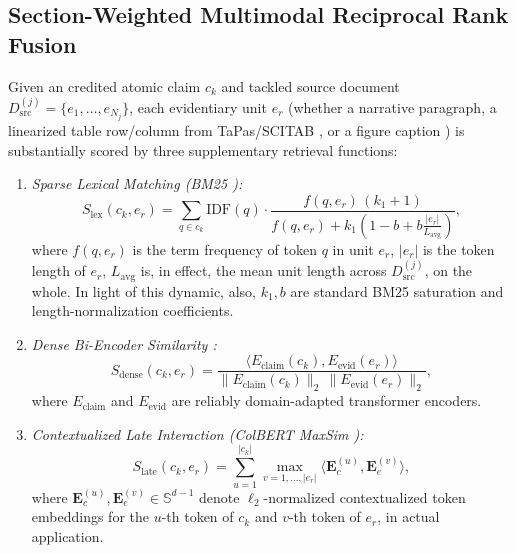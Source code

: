 \documentclass[journal]{IEEEtran}
\begin{document}
\subsection{Section-Weighted Multimodal Reciprocal Rank Fusion}
Given an credited atomic claim $c_k$ and tackled source document $D_{\text{src}}^{(j)} = \{e_1, \dots, e_{N_j}\}$, each evidentiary unit $e_r$ (whether a narrative paragraph, a linearized table row/column from TaPas/SCITAB \cite{herzig2020tapas,lu2023scitab}, or a figure caption \cite{akhtar2023reading}) is substantially scored by three supplementary retrieval functions:
\begin{enumerate}
\item \emph{Sparse Lexical Matching (BM25 \cite{robertson2009probabilistic}):}
\begin{equation}
S_{\text{lex}}(c_k, e_r) = \sum_{q \in c_k} \text{IDF}(q) \cdot \frac{f(q, e_r)\,(k_1 + 1)}{f(q, e_r) + k_1 \left(1 - b + b \frac{|e_r|}{L_{\text{avg}}}\right)},
\label{eq:bm25}
\end{equation}
where $f(q, e_r)$ is the term frequency of token $q$ in unit $e_r$, $|e_r|$ is the token length of $e_r$, $L_{\text{avg}}$ is, in effect, the mean unit length across $D_{\text{src}}^{(j)}$, on the whole. In light of this dynamic, also, $k_1, b$ are standard BM25 saturation and length-normalization coefficients.
\item \emph{Dense Bi-Encoder Similarity \cite{beltagy2019scibert,cohan2020specter,karpukhin2020dense}:}
\begin{equation}
S_{\text{dense}}(c_k, e_r) = \frac{\langle E_{\text{claim}}(c_k), E_{\text{evid}}(e_r) \rangle}{\|E_{\text{claim}}(c_k)\|_2 \, \|E_{\text{evid}}(e_r)\|_2},
\label{eq:dense_sim}
\end{equation}
where $E_{\text{claim}}$ and $E_{\text{evid}}$ are reliably domain-adapted transformer encoders.
\item \emph{Contextualized Late Interaction (ColBERT MaxSim \cite{khattab2020colbert}):}
\begin{equation}
S_{\text{late}}(c_k, e_r) = \sum_{u=1}^{|c_k|} \max_{v=1, \dots, |e_r|} \langle \mathbf{E}_c^{(u)}, \mathbf{E}_e^{(v)} \rangle,
\label{eq:colbert}
\end{equation}
where $\mathbf{E}_c^{(u)}, \mathbf{E}_e^{(v)} \in \mathbb{S}^{d-1}$ denote $\ell_2$-normalized contextualized token embeddings for the $u$-th token of $c_k$ and $v$-th token of $e_r$, in actual application.
\end{enumerate}
\end{document}
